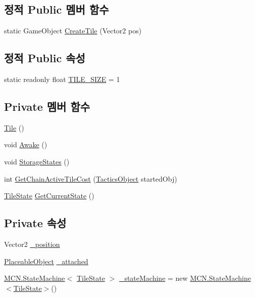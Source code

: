 \subsection*{정적 Public 멤버 함수}
\begin{DoxyCompactItemize}
\item 
static Game\+Object \hyperlink{class_tile_aec3cdb55a67f4c12d3056355c15bdba2}{Create\+Tile} (Vector2 pos)
\end{DoxyCompactItemize}
\subsection*{정적 Public 속성}
\begin{DoxyCompactItemize}
\item 
static readonly float \hyperlink{class_tile_a51b7dea4344573ba12a461a32517e683}{T\+I\+L\+E\+\_\+\+S\+I\+ZE} = 1
\end{DoxyCompactItemize}
\subsection*{Private 멤버 함수}
\begin{DoxyCompactItemize}
\item 
\hyperlink{class_tile_a7684d2e86beeb06d844ebb7819b11b33}{Tile} ()
\item 
void \hyperlink{class_tile_a4fbf82b2a26cdeb792dc78192d7247dc}{Awake} ()
\item 
void \hyperlink{class_tile_a6cb69a9fad04bee1fa3473aec22428de}{Storage\+States} ()
\item 
int \hyperlink{class_tile_a81b4dd833bdeade289583aabbdcaff73}{Get\+Chain\+Active\+Tile\+Cost} (\hyperlink{class_tactics_object}{Tactics\+Object} started\+Obj)
\item 
\hyperlink{class_tile_1_1_tile_state}{Tile\+State} \hyperlink{class_tile_ae37e08e39263e766fdc612de94fb7a0d}{Get\+Current\+State} ()
\end{DoxyCompactItemize}
\subsection*{Private 속성}
\begin{DoxyCompactItemize}
\item 
Vector2 \hyperlink{class_tile_a56d02616cede51da0afdceff82ca958d}{\+\_\+position}
\item 
\hyperlink{class_placeable_object}{Placeable\+Object} \hyperlink{class_tile_aa548ae60732f4d054b6777436baefdd5}{\+\_\+attached}
\item 
\hyperlink{class_m_c_n_1_1_state_machine}{M\+C\+N.\+State\+Machine}$<$ \hyperlink{class_tile_1_1_tile_state}{Tile\+State} $>$ \hyperlink{class_tile_a822a1bffe56b1193b8c5c61070ea7827}{\+\_\+state\+Machine} = new \hyperlink{class_m_c_n_1_1_state_machine}{M\+C\+N.\+State\+Machine}$<$\hyperlink{class_tile_1_1_tile_state}{Tile\+State}$>$()
\end{DoxyCompactItemize}


